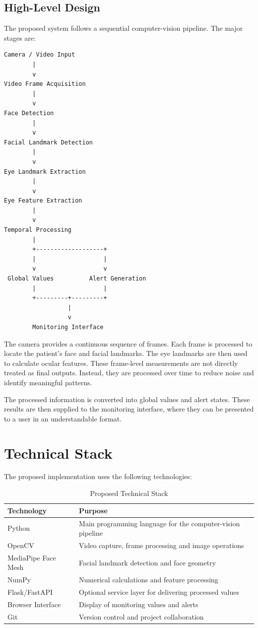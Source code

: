 \documentclass[12pt]{tietreport}
\begin{document}
\subsection{High-Level Design}

The proposed system follows a sequential computer-vision pipeline.
The major stages are:

\begin{center}
\begin{verbatim}
Camera / Video Input
        |
        v
Video Frame Acquisition
        |
        v
Face Detection
        |
        v
Facial Landmark Detection
        |
        v
Eye Landmark Extraction
        |
        v
Eye Feature Extraction
        |
        v
Temporal Processing
        |
        +-------------------+
        |                   |
        v                   v
 Global Values          Alert Generation
        |                   |
        +---------+---------+
                  |
                  v
        Monitoring Interface
\end{verbatim}
\end{center}

The camera provides a continuous sequence of frames. Each frame is
processed to locate the patient's face and facial landmarks. The eye
landmarks are then used to calculate ocular features. These
frame-level measurements are not directly treated as final outputs.
Instead, they are processed over time to reduce noise and identify
meaningful patterns.

The processed information is converted into global values and alert
states. These results are then supplied to the monitoring interface,
where they can be presented to a user in an understandable format.

\section{Technical Stack}

The proposed implementation uses the following technologies:

\begin{table}[H]
\centering
\caption{Proposed Technical Stack}
\begin{tabular}{p{}p{}}
\toprule
\textbf{Technology} & \textbf{Purpose} \\
\midrule
Python & Main programming language for the computer-vision pipeline \\
OpenCV & Video capture, frame processing and image operations \\
MediaPipe Face Mesh & Facial landmark detection and face geometry \\
NumPy & Numerical calculations and feature processing \\
Flask/FastAPI & Optional service layer for delivering processed values \\
Browser Interface & Display of monitoring values and alerts \\
Git & Version control and project collaboration \\
\bottomrule
\end{tabular}
\end{table}
\end{document}
